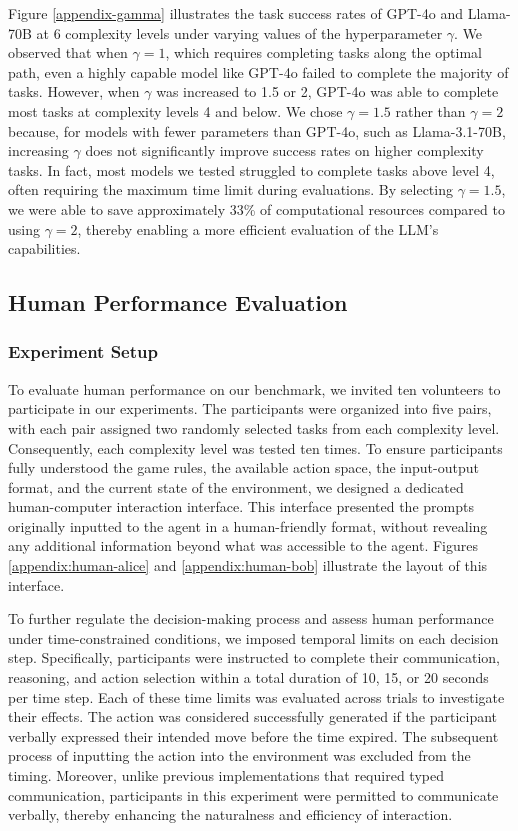 \documentclass[11pt]{article}
\begin{document}
Figure \ref{appendix-gamma} illustrates the task success rates of GPT-4o and Llama-70B at 6 complexity levels under varying values of the hyperparameter $\gamma$. We observed that when $\gamma = 1$, which requires completing tasks along the optimal path, even a highly capable model like GPT-4o failed to complete the majority of tasks. However, when $\gamma$ was increased to 1.5 or 2, GPT-4o was able to complete most tasks at complexity levels 4 and below. We chose $\gamma = 1.5$ rather than $\gamma = 2$ because, for models with fewer parameters than GPT-4o, such as Llama-3.1-70B, increasing $\gamma$ does not significantly improve success rates on higher complexity tasks. In fact, most models we tested struggled to complete tasks above level 4, often requiring the maximum time limit during evaluations. By selecting $\gamma = 1.5$, we were able to save approximately 33\% of computational resources compared to using $\gamma = 2$, thereby enabling a more efficient evaluation of the LLM’s capabilities.




\subsection{Human Performance Evaluation}

\label{ap-human}

\subsubsection{Experiment Setup}

To evaluate human performance on our benchmark, we invited ten volunteers to participate in our experiments. The participants were organized into five pairs, with each pair assigned two randomly selected tasks from each complexity level. Consequently, each complexity level was tested ten times. To ensure participants fully understood the game rules, the available action space, the input-output format, and the current state of the environment, we designed a dedicated human-computer interaction interface. This interface presented the prompts originally inputted to the agent in a human-friendly format, without revealing any additional information beyond what was accessible to the agent. Figures \ref{appendix:human-alice} and \ref{appendix:human-bob} illustrate the layout of this interface.

To further regulate the decision-making process and assess human performance under time-constrained conditions, we imposed temporal limits on each decision step. Specifically, participants were instructed to complete their communication, reasoning, and action selection within a total duration of 10, 15, or 20 seconds per time step. Each of these time limits was evaluated across trials to investigate their effects. The action was considered successfully generated if the participant verbally expressed their intended move before the time expired. The subsequent process of inputting the action into the environment was excluded from the timing. Moreover, unlike previous implementations that required typed communication, participants in this experiment were permitted to communicate verbally, thereby enhancing the naturalness and efficiency of interaction.
\end{document}
